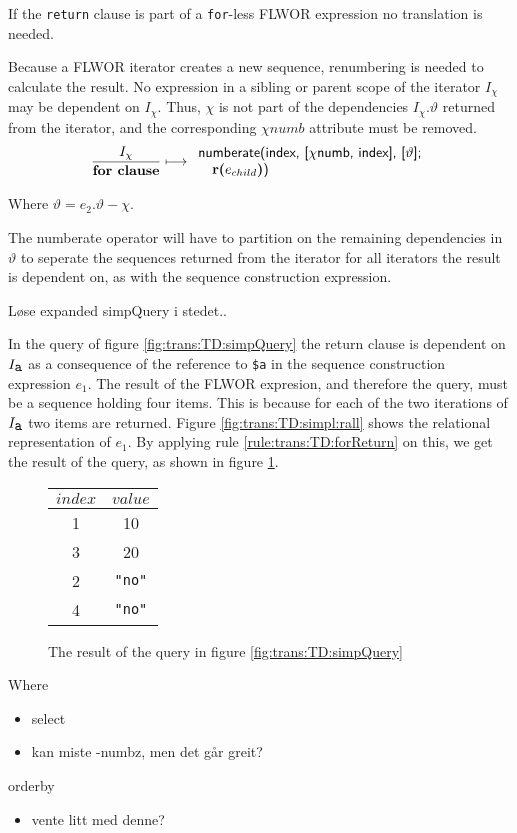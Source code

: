 If the \texttt{return} clause is part of a \texttt{for}-less FLWOR expression no translation is needed.

Because a FLWOR iterator creates a new sequence, renumbering is needed to calculate the result. No expression in a
sibling or parent scope of the iterator $I_{\chi}$ may be dependent on $I_{\chi}$. Thus, $\chi$ is not part of the
dependencies $I_{\chi}.\vartheta$ returned from the iterator, and the corresponding $\chi{numb}$ attribute must be
removed.
\begin{equation}
\frac{I_{\chi}}{\mbox{\textbf{for clause}}}
\longmapsto
\begin{array}{l}
\mbox{\textsf{numberate(index, [}}\chi\mbox{\textsf{numb, index], [}}\vartheta\mbox{\textsf{];}} \\ \quad
\mbox{\textbf{r(}}e_{child}\mbox{\textbf{)}\textsf{)}}
\end{array}
\label{rule:trans:TD:forReturn}
\end{equation}

Where $\vartheta = e_{2}.\vartheta - \chi$.

The \textsf{numberate} operator will have to partition on the remaining dependencies in $\vartheta$ to seperate
the sequences returned from the iterator for all iterators the result is dependent on, as with the sequence
construction expression.

\begin{myExample}
L\o se expanded simpQuery i stedet..

In the query of figure \ref{fig:trans:TD:simpQuery} the return clause is dependent on $I_{\mbox{\texttt{a}}}$
as a consequence of the reference to \texttt{\$a} in the sequence construction expression $e_{1}$. The result of
the FLWOR expresion, and therefore the query, must be a sequence holding four items. This is because for each of
the two iterations of $I_{\mbox{\texttt{a}}}$ two items are returned. Figure \ref{fig:trans:TD:simpl:rall} shows
the relational representation of $e_{1}$. By applying rule \ref{rule:trans:TD:forReturn} on this, we get the
result of the query, as shown in figure \ref{fig:trans:TD:simpRes}.

\begin{figure}[h]
\centering
\begin{tabular}{|c|c|} \hline
$index$ & $value$ \\\hline
1 & 10 \\\hline
3 & 20 \\\hline
2 & \texttt{"no"} \\\hline
4 & \texttt{"no"} \\\hline
\end{tabular}
\caption{The result of the query in figure \ref{fig:trans:TD:simpQuery}}
\label{fig:trans:TD:simpRes}
\end{figure}

\end{myExample}


Where
\begin{itemize}
  \item select
  \item kan miste -numbz, men det g\aa r greit?
\end{itemize}

orderby
\begin{itemize}
  \item vente litt med denne?
\end{itemize}

